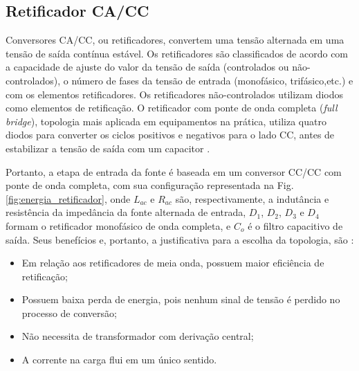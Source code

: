 \subsection{Retificador CA/CC}


Conversores CA/CC, ou retificadores, convertem uma tensão alternada em uma tensão de saída contínua estável. Os retificadores são classificados de acordo com a capacidade de ajuste do valor da tensão de saída (controlados ou não-controlados), o número de fases da tensão de entrada (monofásico, trifásico,etc.) e com os elementos retificadores. Os retificadores não-controlados utilizam diodos como elementos de retificação. O retificador com ponte de onda completa (\textit{full bridge}), topologia mais aplicada em equipamentos na prática, utiliza quatro diodos para converter os ciclos positivos e negativos para o lado CC, antes de estabilizar a tensão de saída com um capacitor \cite{Conversores,Conversores2}. 

Portanto, a etapa de entrada da fonte é baseada em um conversor CC/CC com ponte de onda completa, com sua configuração representada na Fig. \ref{fig:energia_retificador}, onde $L_{ac}$ e $R_{ac}$ são, respectivamente, a indutância e resistência da impedância da fonte alternada de entrada, $D_{1}$, $D_{2}$, $D_{3}$ e $D_{4}$ formam o retificador monofásico de onda completa, e $C_{o}$ é o filtro capacitivo de saída. Seus benefícios e, portanto, a justificativa para a escolha da topologia, são \cite{retificador}:

\begin{itemize}
    \item Em relação aos retificadores de meia onda, possuem maior eficiência de retificação;
    
    \item Possuem baixa perda de energia, pois nenhum sinal de tensão é perdido no processo de conversão;
    
    \item Não necessita de transformador com derivação central;
    
    \item A corrente na carga flui em um único sentido.
\end{itemize}


